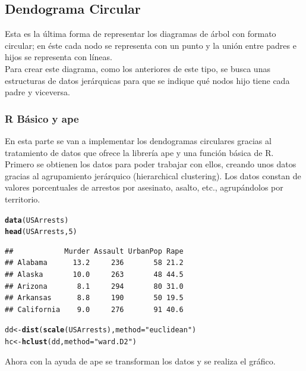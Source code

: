 \documentclass{article}\usepackage[]{graphicx}\usepackage[]{color}
\makeatletter
\newcommand{\hlnum}[1]{\textcolor[rgb]{0.686,0.059,0.569}{#1}}%
\newcommand{\hlstr}[1]{\textcolor[rgb]{0.192,0.494,0.8}{#1}}%
\newcommand{\hlstd}[1]{\textcolor[rgb]{0.345,0.345,0.345}{#1}}%
\newcommand{\hlkwb}[1]{\textcolor[rgb]{0.69,0.353,0.396}{#1}}%
\newcommand{\hlkwc}[1]{\textcolor[rgb]{0.333,0.667,0.333}{#1}}%
\newcommand{\hlkwd}[1]{\textcolor[rgb]{0.737,0.353,0.396}{\textbf{#1}}}%
\newenvironment{kframe}{%
 \def\at@end@of@kframe{}%
 \ifinner\ifhmode%
  \def\at@end@of@kframe{\end{minipage}}%
  \begin{minipage}{\columnwidth}%
 \fi\fi%
 \def\FrameCommand##1{\hskip\@totalleftmargin \hskip-\fboxsep
 \colorbox{shadecolor}{##1}\hskip-\fboxsep
     \hskip-\linewidth \hskip-\@totalleftmargin \hskip\columnwidth}%
 \MakeFramed {\advance\hsize-\width
   \@totalleftmargin\z@ \linewidth\hsize
   \@setminipage}}%
 {\par\unskip\endMakeFramed%
 \at@end@of@kframe}
\newenvironment{knitrout}{}{} %
\makeatother
\begin{document}
\subsection{Dendograma Circular}\label{ssec:dendograma}
Esta es la \'ultima forma de representar los diagramas de \'arbol con formato circular; en \'este cada nodo se representa con un punto y la uni\'on entre padres e hijos se representa con l\'ineas. 
~\\Para crear este diagrama, como los anteriores de este tipo, se busca unas estructuras de datos jer\'arquicas para que se indique qu\'e nodos hijo tiene cada padre y viceversa.
\subsubsection{R B\'asico y ape}
En esta parte se van a implementar los dendogramas circulares gracias al tratamiento de datos que ofrece la librer\'ia ape y una funci\'on b\'asica de R.~\\
Primero se obtienen los datos para poder trabajar con ellos, creando unos datos gracias al agrupamiento jer\'arquico (hierarchical clustering). Los datos constan de valores porcentuales de arrestos por asesinato, asalto, etc., agrup\'andolos por territorio.
\begin{knitrout}
\color{fgcolor}\begin{kframe}
\begin{alltt}
\hlkwd{data}\hlstd{(USArrests)}
\hlkwd{head}\hlstd{(USArrests,}\hlnum{5}\hlstd{)}
\end{alltt}
\begin{verbatim}
##            Murder Assault UrbanPop Rape
## Alabama      13.2     236       58 21.2
## Alaska       10.0     263       48 44.5
## Arizona       8.1     294       80 31.0
## Arkansas      8.8     190       50 19.5
## California    9.0     276       91 40.6
\end{verbatim}
\begin{alltt}
\hlstd{dd} \hlkwb{<-} \hlkwd{dist}\hlstd{(}\hlkwd{scale}\hlstd{(USArrests),} \hlkwc{method} \hlstd{=} \hlstr{"euclidean"}\hlstd{)}
\hlstd{hc} \hlkwb{<-} \hlkwd{hclust}\hlstd{(dd,} \hlkwc{method} \hlstd{=} \hlstr{"ward.D2"}\hlstd{)}
\end{alltt}
\end{kframe}
\end{knitrout}
Ahora con la ayuda de ape\cite{docu_ape} se transforman los datos y se realiza el gr\'afico.
\end{document}
